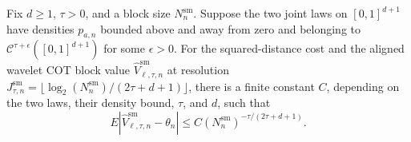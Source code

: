 Fix \(d\ge1\), \(\tau>0\), and a block size \(N_n^{\mathrm{sm}}\). Suppose the two joint laws on \([0,1]^{d+1}\) have densities \(p_{a,n}\) bounded above and away from zero and belonging to \(\mathcal C^{\tau+\epsilon}([0,1]^{d+1})\) for some \(\epsilon>0\). For the squared-distance cost and the aligned wavelet COT block value \(\widehat V_{\ell,\tau,n}^{\mathrm{sm}}\) at resolution \(J_{\tau,n}^{\mathrm{sm}}=\lfloor\log_2(N_n^{\mathrm{sm}})/(2\tau+d+1)\rfloor\), there is a finite constant \(C\), depending on the two laws, their density bound, \(\tau\), and \(d\), such that
\[
E\left|\widehat V_{\ell,\tau,n}^{\mathrm{sm}}-\theta_n\right|
\le C(N_n^{\mathrm{sm}})^{-\tau/(2\tau+d+1)}.
\]